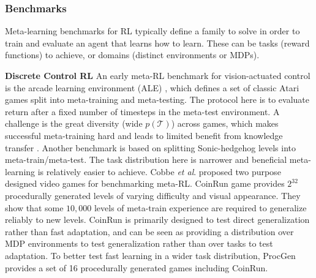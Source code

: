 \documentclass[10pt,journal,compsoc]{IEEEtran}
\newcommand{\cut}[1]{}
\newcommand{\keypoint}[1]{\vspace{0.1cm}\noindent\textbf{#1}\quad}
\newcommand{\etal}{\textit{et al}.}
\begin{document}
\subsubsection{Benchmarks}
Meta-learning benchmarks for RL typically define a family to solve in order to train and evaluate an agent that learns how to learn. These can be tasks (reward functions) to achieve, or domains (distinct environments or MDPs).  

\keypoint{Discrete Control RL} An early meta-RL benchmark for vision-actuated control is the arcade learning environment (ALE) \cite{machado2018revisiting}, which defines a set of classic Atari games split into meta-training and meta-testing. The protocol here is to evaluate return after a fixed number of timesteps in the meta-test environment. \cut{One issue with Atari games is their determinism which means that an open-loop policy is potentially sufficient to solve them, leading to efforts to insert stochasticity \cite{machado2018revisiting}. }
A challenge is the great diversity (wide $p(\mathcal{T})$) across games, which makes successful meta-training hard and leads to limited benefit from knowledge transfer \cite{machado2018revisiting}. Another benchmark \cite{nichol2018learnfast} is based on splitting Sonic-hedgehog levels into meta-train/meta-test. The task distribution here is narrower and beneficial meta-learning is relatively easier to achieve. Cobbe \etal \cite{cobbe2019quantifying} proposed two purpose designed video games for benchmarking meta-RL. CoinRun game \cite{cobbe2019quantifying} provides $2^{32}$ procedurally generated levels of varying difficulty and visual appearance. They show that some $10,000$ levels of meta-train experience are required to generalize reliably to new levels. CoinRun is primarily designed to test direct generalization rather than fast adaptation, and can be seen as providing a distribution over MDP environments to test generalization rather than over tasks to test adaptation. To better test fast learning in a wider task distribution, ProcGen \cite{cobbe2019quantifying} provides a set of 16 procedurally generated games including CoinRun.
\end{document}
